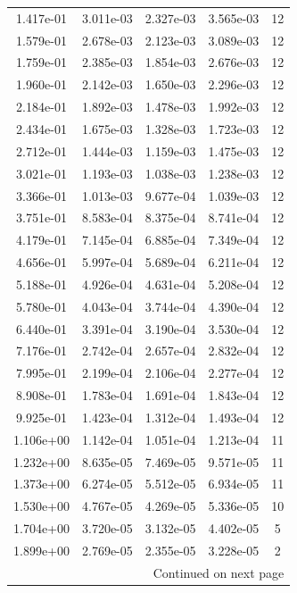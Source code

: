 \documentclass[traditabstract   ]{aa} %
\begin{document}
\begin{appendix}
\begin{table}
\begin{center}
\begin{tabular}{ c c c c c }
1.417e-01 & 3.011e-03 & 2.327e-03 & 3.565e-03 & 12 \\
1.579e-01 & 2.678e-03 & 2.123e-03 & 3.089e-03 & 12 \\
1.759e-01 & 2.385e-03 & 1.854e-03 & 2.676e-03 & 12 \\
1.960e-01 & 2.142e-03 & 1.650e-03 & 2.296e-03 & 12 \\
2.184e-01 & 1.892e-03 & 1.478e-03 & 1.992e-03 & 12 \\
2.434e-01 & 1.675e-03 & 1.328e-03 & 1.723e-03 & 12 \\
2.712e-01 & 1.444e-03 & 1.159e-03 & 1.475e-03 & 12 \\
3.021e-01 & 1.193e-03 & 1.038e-03 & 1.238e-03 & 12 \\
3.366e-01 & 1.013e-03 & 9.677e-04 & 1.039e-03 & 12 \\
3.751e-01 & 8.583e-04 & 8.375e-04 & 8.741e-04 & 12 \\
4.179e-01 & 7.145e-04 & 6.885e-04 & 7.349e-04 & 12 \\
4.656e-01 & 5.997e-04 & 5.689e-04 & 6.211e-04 & 12 \\
5.188e-01 & 4.926e-04 & 4.631e-04 & 5.208e-04 & 12 \\
5.780e-01 & 4.043e-04 & 3.744e-04 & 4.390e-04 & 12 \\
6.440e-01 & 3.391e-04 & 3.190e-04 & 3.530e-04 & 12 \\
7.176e-01 & 2.742e-04 & 2.657e-04 & 2.832e-04 & 12 \\
7.995e-01 & 2.199e-04 & 2.106e-04 & 2.277e-04 & 12 \\
8.908e-01 & 1.783e-04 & 1.691e-04 & 1.843e-04 & 12 \\
9.925e-01 & 1.423e-04 & 1.312e-04 & 1.493e-04 & 12 \\
1.106e+00 & 1.142e-04 & 1.051e-04 & 1.213e-04 & 11 \\
1.232e+00 & 8.635e-05 & 7.469e-05 & 9.571e-05 & 11 \\
1.373e+00 & 6.274e-05 & 5.512e-05 & 6.934e-05 & 11 \\
1.530e+00 & 4.767e-05 & 4.269e-05 & 5.336e-05 & 10 \\
1.704e+00 & 3.720e-05 & 3.132e-05 & 4.402e-05 & 5 \\
1.899e+00 & 2.769e-05 & 2.355e-05 & 3.228e-05 & 2 \\
\hline \multicolumn{5}{r}{{Continued on next page}} \\ \hline
\end{tabular}
\end{center}
\end{table}
\addtocounter{table}{-1}


\end{appendix}
\end{document}
